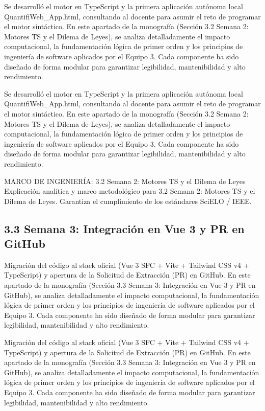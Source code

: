 \documentclass[11pt,a4paper]{article}
\begin{document}
Se desarrolló el motor en TypeScript y la primera aplicación autónoma
local QuantifiWeb\_App.html, consultando al docente para asumir el reto
de programar el motor sintáctico. En este apartado de la monografía
(Sección 3.2 Semana 2: Motores TS y el Dilema de Leyes), se analiza
detalladamente el impacto computacional, la fundamentación lógica de
primer orden y los principios de ingeniería de software aplicados por el
Equipo 3. Cada componente ha sido diseñado de forma modular para
garantizar legibilidad, mantenibilidad y alto rendimiento.

Se desarrolló el motor en TypeScript y la primera aplicación autónoma
local QuantifiWeb\_App.html, consultando al docente para asumir el reto
de programar el motor sintáctico. En este apartado de la monografía
(Sección 3.2 Semana 2: Motores TS y el Dilema de Leyes), se analiza
detalladamente el impacto computacional, la fundamentación lógica de
primer orden y los principios de ingeniería de software aplicados por el
Equipo 3. Cada componente ha sido diseñado de forma modular para
garantizar legibilidad, mantenibilidad y alto rendimiento.

\medskip\hrulefill\medskip
 MARCO DE INGENIERÍA: 3.2 Semana 2: Motores TS y el Dilema de Leyes
Explicación analítica y marco metodológico para 3.2 Semana 2: Motores
TS y el Dilema de Leyes. Garantiza el cumplimiento de los estándares
SciELO / IEEE.
\medskip\hrulefill\medskip

\medskip\hrulefill\medskip

\subsection{3.3 Semana 3: Integración en Vue 3 y PR en GitHub}

Migración del código al stack oficial (Vue 3 SFC + Vite + Tailwind CSS
v4 + TypeScript) y apertura de la Solicitud de Extracción (PR) en
GitHub. En este apartado de la monografía (Sección 3.3 Semana 3:
Integración en Vue 3 y PR en GitHub), se analiza detalladamente el
impacto computacional, la fundamentación lógica de primer orden y los
principios de ingeniería de software aplicados por el Equipo 3. Cada
componente ha sido diseñado de forma modular para garantizar
legibilidad, mantenibilidad y alto rendimiento.

Migración del código al stack oficial (Vue 3 SFC + Vite + Tailwind CSS
v4 + TypeScript) y apertura de la Solicitud de Extracción (PR) en
GitHub. En este apartado de la monografía (Sección 3.3 Semana 3:
Integración en Vue 3 y PR en GitHub), se analiza detalladamente el
impacto computacional, la fundamentación lógica de primer orden y los
principios de ingeniería de software aplicados por el Equipo 3. Cada
componente ha sido diseñado de forma modular para garantizar
legibilidad, mantenibilidad y alto rendimiento.
\end{document}
